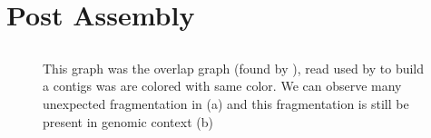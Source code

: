 \documentclass[main]{subfiles}
\begin{document}
\chapter{Post Assembly} 

\section{\knot} \label{section:postassembly:knot}

\begin{figure}[ht]
    \newline
    \caption{This graph was the overlap graph (found by \minimap), read used by \canu to build a contigs was are colored with same color. We can observe many unexpected fragmentation in (a) and this fragmentation is still be present in genomic context (b)}
    \label{fig:my_label}
\end{figure}
\end{document}
